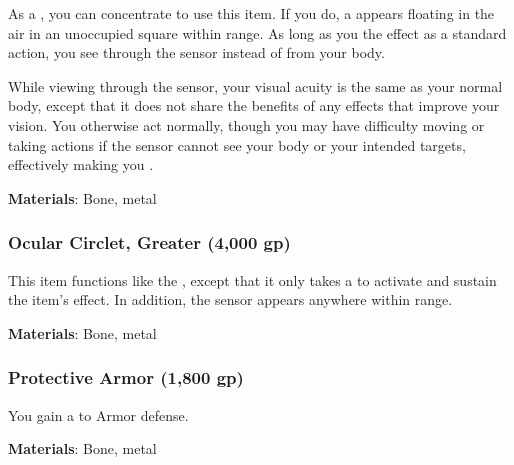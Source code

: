 As a , you can concentrate to use this item.
If you do, a  appears floating in the air in an unoccupied square within \rngclose range.
As long as you  the effect as a standard action, you see through the sensor instead of from your body.

While viewing through the sensor, your visual acuity is the same as your normal body,
except that it does not share the benefits of any  effects that improve your vision.
You otherwise act normally, though you may have difficulty moving or taking actions if the sensor cannot see your body or your intended targets, effectively making you \blinded.



\vspace{0.25em}
\textbf{Materials}: Bone, metal


\lowercase{\hypertarget{item:Ocular Circlet, Greater}{}}\label{item:Ocular Circlet, Greater}
\hypertarget{item:Ocular Circlet, Greater}{\subsubsection{Ocular Circlet, Greater\hfill{} (4,000 gp)}}

This item functions like the , except that it only takes a  to activate and sustain the item's effect.
In addition, the sensor appears anywhere within \rngmed range.



\vspace{0.25em}
\textbf{Materials}: Bone, metal


\lowercase{\hypertarget{item:Protective Armor}{}}\label{item:Protective Armor}
\hypertarget{item:Protective Armor}{\subsubsection{Protective Armor\hfill{} (1,800 gp)}}

You gain a   to Armor defense.



\vspace{0.25em}
\textbf{Materials}: Bone, metal


